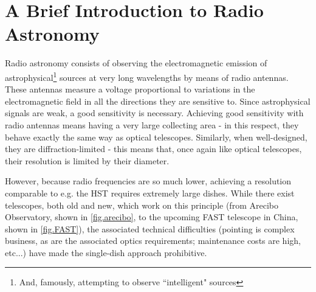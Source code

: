 

%
%

\section{A Brief Introduction to Radio Astronomy}
\pg
Radio astronomy consists of observing the electromagnetic emission of astrophysical\footnote{And, famously, attempting to observe ``intelligent" sources } sources at very long wavelengths by means of radio antennas. These antennas measure a voltage proportional to variations in the electromagnetic field in all the directions they are sensitive to. Since astrophysical signals are weak, a good sensitivity is necessary. Achieving good sensitivity with radio antennas means having a very large collecting area - in this respect, they behave exactly the same way as optical telescopes. Similarly, when well-designed, they are diffraction-limited - this means that, once again like optical telescopes, their resolution is limited by their diameter.

\pg
However, because radio frequencies are so much lower, achieving a resolution comparable to e.g. the HST requires extremely large dishes. While there exist telescopes, both old and new, which work on this principle (from Arecibo Observatory, shown in \cref{fig.arecibo}, to the upcoming FAST telescope in China, shown in \cref{fig.FAST}), the associated technical difficulties (pointing is complex business, as are the associated optics requirements; maintenance costs are high, etc...) have made the single-dish approach prohibitive.

